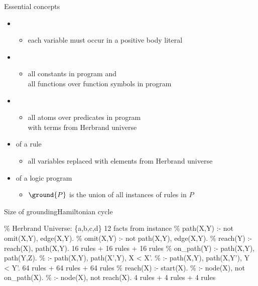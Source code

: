 \begin{frame}{Essential concepts}
  \begin{itemize}
    \item {}
      \begin{itemize}\normalsize
        \item each variable must occur in a positive body literal
      \end{itemize}
    \item {}
      \begin{itemize}\normalsize
        \item
          all constants in program and\\
          all functions over function symbols in program
      \end{itemize}
    \item {}
      \begin{itemize}\normalsize
        \item all atoms over predicates in program\\ with terms from Herbrand universe
      \end{itemize}
    \item {}  of a rule
      \begin{itemize}\normalsize
        \item all variables replaced with elements from Herbrand universe
      \end{itemize}
    \item {} of a logic program
      \begin{itemize}\normalsize
        \item \(\ground{P}\) is the union of all instances of %
              rules in \(P\)
      \end{itemize}
  \end{itemize}
\end{frame}
\begin{frame}{Size of grounding}{Hamiltonian cycle}
  \begin{SemiVerbatim}{.9}
{\color{comment}\% Herbrand Universe: \{a,b,c,d\}}
12 facts from instance
{\color{comment}\% path(X,Y) :- not omit(X,Y), edge(X,Y).}
{\color{comment}\% omit(X,Y) :- not path(X,Y), edge(X,Y).}
{\color{comment}\% reach(Y) :- reach(X), path(X,Y).}
16 rules + 16 rules + 16 rules
{\color{comment}\% on_path(Y) :- path(X,Y), path(Y,Z).}
{\color{comment}\% :- path(X,Y), path(X',Y), X < X'.}
{\color{comment}\% :- path(X,Y), path(X,Y'), Y < Y'.}
64 rules + 64 rules + 64 rules
{\color{comment}\% reach(X) :- start(X).}
{\color{comment}\% :- node(X), not on_path(X).}
{\color{comment}\% :- node(X), not reach(X).}
4 rules + 4 rules + 4 rules
  \end{SemiVerbatim}
\end{frame}
